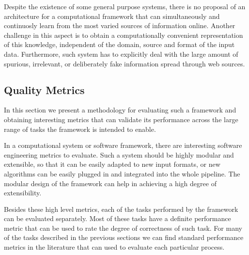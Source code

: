       Despite the existence of some general purpose systems, 
      there is no proposal of an architecture for a computational framework
      that can simultaneously and continuosly learn from the most varied sources of information online.
      Another challenge in this aspect is to obtain a computationally convenient representation
      of this knowledge, independent of the domain, source and format of the input data.
      Furthermore, such system has to explicitly deal with the large amount of spurious,
      irrelevant, or deliberately fake information spread through web sources.
  
    \subsection{Quality Metrics}\label{sec:evaluation}

    In this section we present a methodology for evaluating such a framework and obtaining
    interesting metrics that can validate its performance across the large range of
    tasks the framework is intended to enable.

    In a computational system or software framework, there are interesting
    software engineering metrics to evaluate. Such a system should be highly modular and
    extensible, so that it can be easily adapted to new input formats, or new algorithms
    can be easily plugged in and integrated into the whole pipeline. 
    The modular design of the framework can help in achieving a high
    degree of extensibility. 

	Besides these high level metrics, each of the tasks performed by the framework can be
    evaluated separately. Most of these tasks have a definite performance metric that can
    be used to rate the degree of correctness of such task. For many of the tasks described in the previous
    sections we can find standard performance metrics in the literature that can used to
    evaluate each particular process.
    

